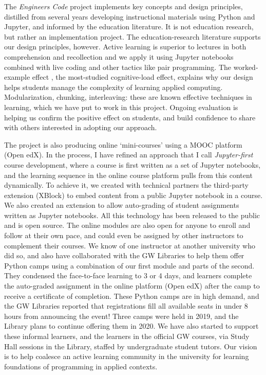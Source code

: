 \documentclass[10pt,journal,compsoc]{IEEEtran}
\begin{document}
The \emph{Engineers Code} project implements key concepts and design principles, distilled from several years developing instructional materials using Python and Jupyter, and informed by the education literature.  
It is not education research, but rather an implementation project. 
The education-research literature supports our design principles, however.
Active learning is superior to lectures in both comprehension and recollection \cite{freeman2014active} and we apply it using Jupyter notebooks combined with live coding and other tactics like pair programming. 
The worked-example effect \cite{chen2015worked}, the most-studied cognitive-load effect, explains why our design helps students manage the complexity of learning applied computing.
Modularization, chunking, interleaving: these are known effective techniques in learning, which we have put to work in this project. 
Ongoing evaluation is helping us confirm the positive effect on students, and build confidence to share with others interested in adopting our approach. 

The project is also producing online `mini-courses' using a MOOC platform (Open edX).
In the process, I have refined an approach that I call \emph{Jupyter-first} course development, where a course is first written as a set of Jupyter notebooks, and the learning sequence in the online course platform pulls from this content dynamically. 
To achieve it, we created with technical partners the third-party extension (XBlock) to embed content from a public Jupyter notebook in a course.
We also created an extension to allow auto-grading of student assignments written as Jupyter notebooks. 
All this technology has been released to the public and is open source. 
The online modules are also open for anyone to enroll and follow at their own pace, and could even be assigned by other instructors to complement their courses. 
We know of one instructor at another university who did so, and also have collaborated with the GW Libraries to help them offer Python camps using a combination of our first module and parts of the second. 
They condensed the face-to-face learning to 3 or 4 days, and learners complete the auto-graded assignment in the online platform (Open edX) after the camp to receive a certificate of completion. 
These Python camps are in high demand, and the GW Libraries reported that registrations fill all available seats in under 8 hours from announcing the event! 
Three camps were held in 2019, and the Library plans to continue offering them in 2020. 
We have also started to support these informal learners, and the learners in the official GW courses, via Study Hall sessions in the Library, staffed by undergraduate student tutors. 
Our vision is to help coalesce an active learning community in the university for learning foundations of programming in applied contexts. 
\end{document}
